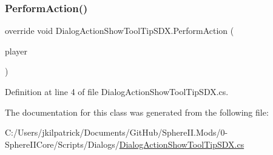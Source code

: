 \subsubsection{\texorpdfstring{PerformAction()}{PerformAction()}}
{\footnotesize\ttfamily override void Dialog\+Action\+Show\+Tool\+Tip\+S\+D\+X.\+Perform\+Action (\begin{DoxyParamCaption}\item[{Entity\+Player}]{player }\end{DoxyParamCaption})}



Definition at line 4 of file Dialog\+Action\+Show\+Tool\+Tip\+S\+D\+X.\+cs.



The documentation for this class was generated from the following file\+:\begin{DoxyCompactItemize}
\item 
C\+:/\+Users/jkilpatrick/\+Documents/\+Git\+Hub/\+Sphere\+I\+I.\+Mods/0-\/\+Sphere\+I\+I\+Core/\+Scripts/\+Dialogs/\mbox{\hyperlink{_dialog_action_show_tool_tip_s_d_x_8cs}{Dialog\+Action\+Show\+Tool\+Tip\+S\+D\+X.\+cs}}\end{DoxyCompactItemize}
